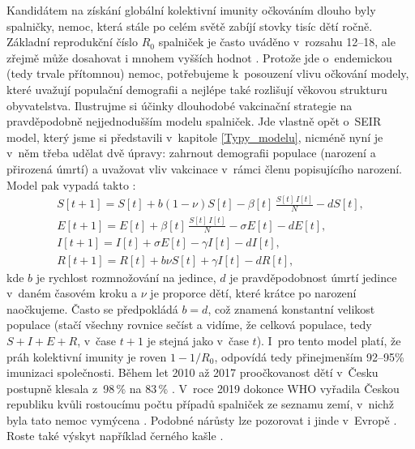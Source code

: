 Kandidátem na získání globální kolektivní imunity očkováním dlouho byly spal\-nič\-ky, nemoc, která stále po celém světě zabíjí stovky tisíc dětí ročně. Základní reprodukční číslo $R_0$ spalniček je často uváděno v~rozsahu 12--18, ale zřejmě může dosahovat i mnohem vyšších hodnot \cite{Guerra_etal2017}. Protože jde o~endemickou (tedy trvale přítomnou) nemoc, potřebujeme k~posouzení vlivu očkování modely, které uvažují populační demografii a nejlépe také rozlišují věkovou strukturu obyvatelstva. Ilustrujme si účinky dlouhodobé vakcinační strategie na pravděpodobně nejjednodušším modelu spalniček. Jde vlastně opět o~SEIR model, který jsme si představili v~kapitole \ref{Typy_modelu}, nicméně nyní je v~něm třeba udělat dvě úpravy: zahrnout demografii populace (narození a přirozená úmrtí) a uvažovat vliv vakcinace v~rámci členu popisujícího narození. Model pak vypadá takto \cite{BolkerGrenfell1993}:
\begin{equation}
	\begin{array}{l}
		\displaystyle{S[t+1] = S[t] + b (1-\nu) S[t] - \beta[t] \, \frac{S[t]\,I[t]}{N} - d S[t]}, \\[3ex]
		\displaystyle{E[t+1] = E[t] + \beta[t] \, \frac{S[t]\,I[t]}{N} - \sigma E[t] - d E[t]}, \\[3ex]
		\displaystyle{I[t+1] = I[t] + \sigma E[t] - \gamma I[t] - d I[t]}, \\[3ex]
		\displaystyle{R[t+1] = R[t] + b \nu S[t] + \gamma I[t] - d R[t]},
	\end{array}
	\label{measles-model1}
\end{equation}
kde $b$ je rychlost rozmnožování na jedince, $d$ je pravděpodobnost úmrtí jedince v~daném časovém kroku a $\nu$ je proporce dětí, které krátce po narození naočkujeme. Často se předpokládá $b=d$, což znamená konstantní velikost populace (stačí všechny rovnice sečíst a vidíme, že celková populace, tedy $S+I+E+R$, v~čase $t+1$ je stejná jako v~čase $t$). I~pro tento model platí, že práh kolektivní imunity je roven $1-1/R_0$, odpovídá tedy přinejmenším 92--95\% imunizaci společnosti. Během let 2010 až 2017 proočkovanost dětí v~Česku postupně klesala z~98\,\% na 83\,\% \cite{spavac}. V~roce 2019 dokonce WHO vyřadila Českou republiku kvůli rostoucímu počtu případů spalniček ze seznamu zemí, v~nichž byla tato nemoc vymýcena \cite{spaend}. Podobné nárůsty lze pozorovat i jinde v~Evropě \cite{Thornton2019}. Roste také výskyt například černého kašle \cite{Lavine_etal2011}. 

